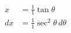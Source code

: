 \documentclass[preview]{standalone}
\begin{document}
\begin{align*}
x&=\frac{1}{1}\tan\theta \\ dx&= \frac{1}{1}\sec^2\theta \, d\theta
\end{align*}
\end{document}

